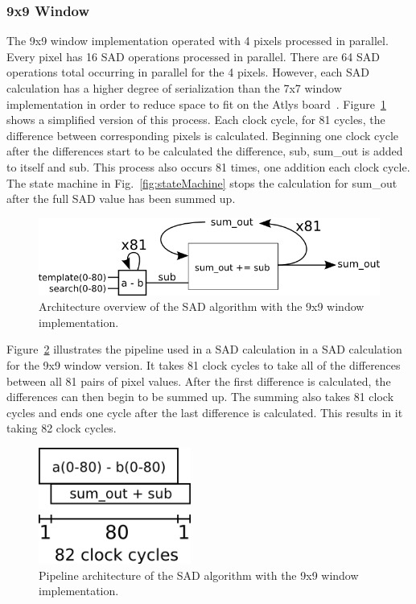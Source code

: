 \subsubsection{9x9 Window}
\label{sec:9x9window}

The 9x9 window implementation operated with 4 pixels processed in parallel. Every pixel has 16 SAD operations processed in parallel. There are 64 SAD operations total occurring in parallel for the 4 pixels. However, each SAD calculation has a higher degree of serialization than the 7x7 window implementation in order to reduce space to fit on the Atlys board~\cite{atlysBoard}. Figure~\ref{fig:sadAlg9x9} shows a simplified version of this process. Each clock cycle, for 81 cycles, the difference between corresponding pixels is calculated. Beginning one clock cycle after the differences start to be calculated the difference, sub, sum\_out is added to itself and sub. This process also occurs 81 times, one addition each clock cycle. The state machine in Fig.~\ref{fig:stateMachine} stops the calculation for sum\_out after the full SAD value has been summed up.

\begin{figure}[h]
	\begin{center}
		\includegraphics[width=120mm]{figures/sadAlgorithm9x9.png}
		\captionfonts
		\caption{Architecture overview of the SAD algorithm with the 9x9 window implementation.}
		\label{fig:sadAlg9x9}
	\end{center}
\end{figure}

Figure~\ref{fig:sadPipe9x9} illustrates the pipeline used in a SAD calculation in a SAD calculation for the 9x9 window version. It takes 81 clock cycles to take all of the differences between all 81 pairs of pixel values. After the first difference is calculated, the differences can then begin to be summed up. The summing also takes 81 clock cycles and ends one cycle after the last difference is calculated. This results in it taking 82 clock cycles.

\begin{figure}[h]
	\begin{center}
		\includegraphics[width=50mm]{figures/sadPipeline9x9.png}
		\captionfonts
		\caption{Pipeline architecture of the SAD algorithm with the 9x9 window implementation.}
		\label{fig:sadPipe9x9}
	\end{center}
\end{figure}

